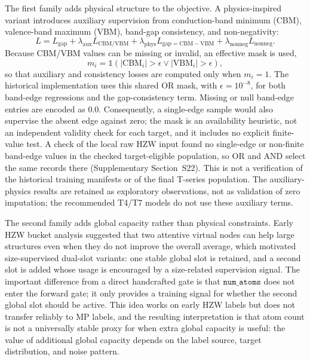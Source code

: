 \documentclass[a4paper,11pt]{article}
\begin{document}
The first family adds physical structure to the objective. A physics-inspired variant introduces auxiliary supervision from conduction-band minimum (CBM), valence-band maximum (VBM), band-gap consistency, and non-negativity:
\begin{equation}
L = L_{\mathrm{gap}} + \lambda_{\mathrm{aux}} L_{\mathrm{CBM/VBM}}
 + \lambda_{\mathrm{phys}} L_{\mathrm{gap=CBM-VBM}}
 + \lambda_{\mathrm{nonneg}} L_{\mathrm{nonneg}}.
\end{equation}
Because CBM/VBM values can be missing or invalid, an effective mask is used,
\begin{equation}
m_i = \mathbb{1}\left(|\mathrm{CBM}_i|>\epsilon \lor |\mathrm{VBM}_i|>\epsilon\right),
\end{equation}
so that auxiliary and consistency losses are computed only when \(m_i=1\). The historical implementation uses this shared OR mask, with \(\epsilon=10^{-8}\), for both band-edge regressions and the gap-consistency term. Missing or null band-edge entries are encoded as 0.0. Consequently, a single-edge sample would also supervise the absent edge against zero; the mask is an availability heuristic, not an independent validity check for each target, and it includes no explicit finite-value test. A check of the local raw HZW input found no single-edge or non-finite band-edge values in the checked target-eligible population, so OR and AND select the same records there (Supplementary Section~S22). This is not a verification of the historical training manifests or of the final T-series population. The auxiliary-physics results are retained as exploratory observations, not as validation of zero imputation; the recommended T4/T7 models do not use these auxiliary terms.

The second family adds global capacity rather than physical constraints. Early HZW bucket analysis suggested that two attentive virtual nodes can help large structures even when they do not improve the overall average, which motivated size-supervised dual-slot variants: one stable global slot is retained, and a second slot is added whose usage is encouraged by a size-related supervision signal. The important difference from a direct handcrafted gate is that \(\texttt{num\_atoms}\) does not enter the forward gate; it only provides a training signal for whether the second global slot should be active. This idea works on early HZW labels but does not transfer reliably to MP labels, and the resulting interpretation is that atom count is not a universally stable proxy for when extra global capacity is useful: the value of additional global capacity depends on the label source, target distribution, and noise pattern.
\end{document}
